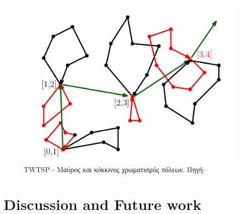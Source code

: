 \documentclass[oneside,12pt]{book}
\newenvironment{matlab}
	{\begin{figure}[hp]\centering\captionsetup{justification=centering}}
	{\end{figure}}
\theoremstyle{definition}
\begin{document}
\begin{matlab}
	\includegraphics[scale=0.8]{images/twtspd.png}
	\caption{TWTSP - Μαύρος και κόκκινος χρωματισμός πόλεων. Πηγή: \cite{12}}
\end{matlab} 

\chapter{Discussion and Future work}
\end{document}
